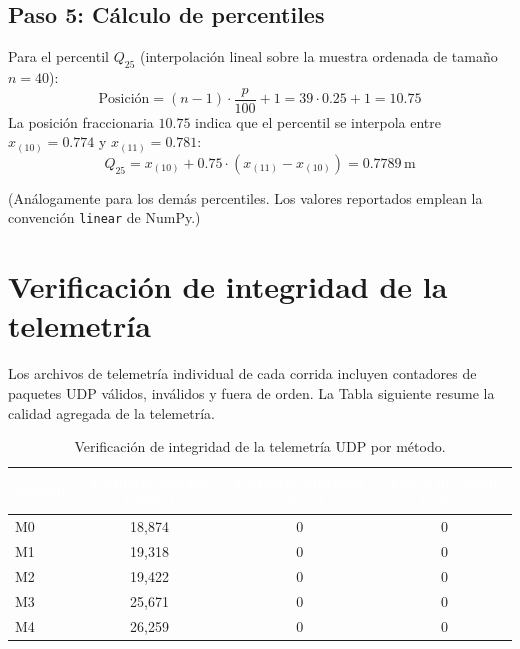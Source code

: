 \documentclass[12pt,a4paper,oneside]{book}
\begin{document}
\subsection{Paso 5: Cálculo de percentiles}

Para el percentil $Q_{25}$ (interpolación lineal sobre la muestra ordenada de tamaño $n=40$):
\begin{equation}
\text{Posición} = (n-1)\cdot \frac{p}{100} + 1 = 39 \cdot 0.25 + 1 = 10.75
\end{equation}
La posición fraccionaria $10.75$ indica que el percentil se interpola entre $x_{(10)}=0.774$ y $x_{(11)}=0.781$:
\begin{equation}
Q_{25} = x_{(10)} + 0.75\cdot(x_{(11)} - x_{(10)}) = 0.7789\,\mathrm{m}
\end{equation}

(Análogamente para los demás percentiles. Los valores reportados emplean la convención \texttt{linear} de NumPy.)

\newpage

\section{Verificación de integridad de la telemetría}

Los archivos de telemetría individual de cada corrida incluyen contadores de paquetes UDP válidos, inválidos y fuera de orden. La Tabla siguiente resume la calidad agregada de la telemetría.

\begin{table}[H]
\centering
\caption{Verificación de integridad de la telemetría UDP por método.}
\renewcommand{\arraystretch}{1.3}
\begin{tabular}{lccc}
\toprule
\rowcolor{primary}
\textcolor{white}{\textbf{Método}} &
\textcolor{white}{\textbf{Paquetes válidos (suma)}} &
\textcolor{white}{\textbf{Paquetes inválidos (suma)}} &
\textcolor{white}{\textbf{Fuera de orden (suma)}} \\
\midrule
M0 & 18,874 & 0 & 0 \\
M1 & 19,318 & 0 & 0 \\
M2 & 19,422 & 0 & 0 \\
M3 & 25,671 & 0 & 0 \\
M4 & 26,259 & 0 & 0 \\
\bottomrule
\end{tabular}
\end{table}
\end{document}
